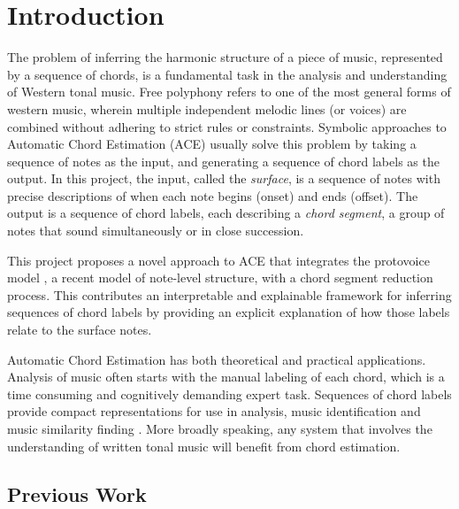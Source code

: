 \documentclass[12pt,a4paper,twoside,openany]{report} \usepackage[pdfborder={0 0 0}]{hyperref}    %
\theoremstyle{definition} \newtheorem{definition}{Definition}[section]
\begin{document}
    \chapter{Introduction}
    The problem of inferring the harmonic structure of a piece of music, represented by a sequence of chords, is
    a fundamental task in the analysis and understanding of Western tonal music. Free polyphony refers to one of the
    most general forms of western music, wherein multiple independent melodic lines (or voices) are combined without
    adhering to strict rules or constraints. 
    Symbolic approaches to Automatic Chord Estimation (ACE) usually solve this problem by taking a sequence of notes
    as the input, and generating a sequence of chord labels as the output.
    In this project, the input, called the \textit{surface}, is a sequence of notes with precise descriptions of when each note begins (onset) and ends (offset). 
    The output is a sequence of chord labels, each describing a \textit{chord segment}, a group of notes
    that sound simultaneously or in close succession. 

    This project proposes a novel approach to ACE that integrates the protovoice model \cite{finkensiepModelingInferringProtovoice2021}, a recent model of note-level structure, 
    with a chord segment reduction process. This contributes an interpretable and explainable framework for inferring sequences of chord labels by providing an explicit explanation of how those labels relate to the surface notes.


    Automatic Chord Estimation has both theoretical and practical applications. 
    Analysis of music often starts with the manual labeling of each chord, which is a time consuming and cognitively
    demanding expert task. Sequences of chord labels provide compact representations for use in analysis, music identification
    and music similarity finding \cite{masadaChordRecognitionSymbolic2018}. More broadly speaking, any system that
    involves the understanding of written tonal music will benefit from chord estimation. 

    \section{Previous Work}
\end{document}
